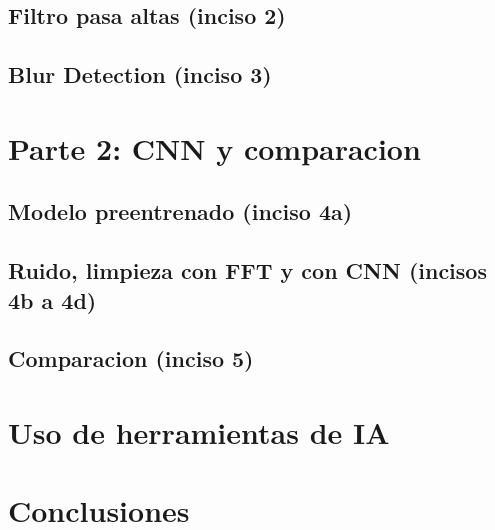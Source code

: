 \documentclass[11pt,letterpaper]{article}
\begin{document}
\subsection{Filtro pasa altas (inciso 2)}
\subsection{Blur Detection (inciso 3)}

\section{Parte 2: CNN y comparacion} %
\subsection{Modelo preentrenado (inciso 4a)}
\subsection{Ruido, limpieza con FFT y con CNN (incisos 4b a 4d)}
\subsection{Comparacion (inciso 5)}

\section{Uso de herramientas de IA}

\section{Conclusiones}
\end{document}
